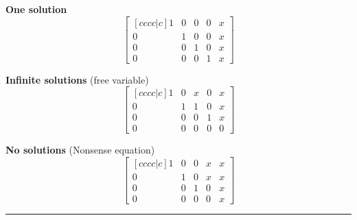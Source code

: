 
 



 
\textbf{One solution}
 \[ 
 \begin{bmatrix}[cccc|c] 
1& 0 & 0	& 0 & x \\
 0 & 1 & 0 & 0 & x \\
  0 & 0 & 1 & 0 &  x \\
    0 & 0 & 0 & 1 & x
    \end{bmatrix} 
 \]



\textbf{Infinite solutions} (free variable)
 \[ 
 \begin{bmatrix}[cccc|c] 
1& 0 & x	& 0 & x \\
 0 & 1 & 1 & 0 & x \\
  0 & 0 & 0 & 1 &  x \\
    0 & 0 & 0 & 0 & 0
    \end{bmatrix} 
 \]


 
\textbf{No solutions} (Nonsense equation)
 \[ 
 \begin{bmatrix}[cccc|c] 
1& 0 & 0	& x & x \\
 0 & 1 & 0 & x & x \\
  0 & 0 & 1 & 0 &  x \\
    0 & 0 & 0 & 0 & x
    \end{bmatrix} 
 \]








\rule[0.01in]{\textwidth}{0.0025in}



